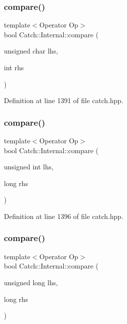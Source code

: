 \subsubsection{\texorpdfstring{compare()}{compare()}\hspace{0.1cm}{\footnotesize\ttfamily [4/17]}}
{\footnotesize\ttfamily template$<$Operator Op$>$ \\
bool Catch\+::\+Internal\+::compare (\begin{DoxyParamCaption}\item[{unsigned char}]{lhs,  }\item[{int}]{rhs }\end{DoxyParamCaption})}



Definition at line 1391 of file catch.\+hpp.

\hypertarget{namespace_catch_1_1_internal_ac2af7b6757f9bb3539bb78acff5c4649}{}\label{namespace_catch_1_1_internal_ac2af7b6757f9bb3539bb78acff5c4649} 
\subsubsection{\texorpdfstring{compare()}{compare()}\hspace{0.1cm}{\footnotesize\ttfamily [5/17]}}
{\footnotesize\ttfamily template$<$Operator Op$>$ \\
bool Catch\+::\+Internal\+::compare (\begin{DoxyParamCaption}\item[{unsigned int}]{lhs,  }\item[{long}]{rhs }\end{DoxyParamCaption})}



Definition at line 1396 of file catch.\+hpp.

\hypertarget{namespace_catch_1_1_internal_ace20062a489a8a7049fe224d62e644a7}{}\label{namespace_catch_1_1_internal_ace20062a489a8a7049fe224d62e644a7} 
\subsubsection{\texorpdfstring{compare()}{compare()}\hspace{0.1cm}{\footnotesize\ttfamily [6/17]}}
{\footnotesize\ttfamily template$<$Operator Op$>$ \\
bool Catch\+::\+Internal\+::compare (\begin{DoxyParamCaption}\item[{unsigned long}]{lhs,  }\item[{long}]{rhs }\end{DoxyParamCaption})}




